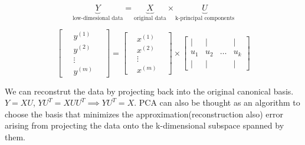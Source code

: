 \documentclass[12pt]{article}
\begin{document}
 $$\underbrace{Y}_\text{low-dimesional  data}= \underbrace{X} _\text{original data}  \times \underbrace{U}_\text{k-principal components}$$
 
$$ \begin{bmatrix} 
\	& y^{(1)} & \ \\
\	& y^{(2)} & \ \\
\	& \vdots &  \ \\
\	& y^{(m)} &\
\end{bmatrix}   =
 \begin{bmatrix} 
	& x^{(1)} &  \\
	& x^{(2)} &\\
	& \vdots & \\
	& x^{(m)} &
\end{bmatrix}  \times 
 \begin{bmatrix} 
	\vert & \vert&  &\vert \\
	u_{1} & u_{2} & \hdots & u_{k}\\
	
	\vert & \vert&  &\vert
\end{bmatrix}  $$


We can reconstrut the data by projecting back into the original canonical basis. $Y = XU$, $YU^{T} = XUU^{T} \implies YU^{T} = X$.
PCA can also be thought as an algorithm to choose the basis that minimizes the approximation(reconstruction also) error arising from projecting the
data onto the k-dimensional subspace spanned by them.

 
 
 
 
 
 
 
 
 
  
 
\end{document}
